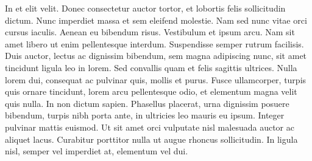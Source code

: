 In et elit velit. Donec consectetur auctor tortor, et lobortis felis
sollicitudin dictum. Nunc imperdiet massa et sem eleifend molestie. Nam sed
nunc vitae orci cursus iaculis. Aenean eu bibendum risus. Vestibulum et ipsum
arcu. Nam sit amet libero ut enim pellentesque interdum. Suspendisse semper
rutrum facilisis. Duis auctor, lectus ac dignissim bibendum, sem magna
adipiscing nunc, sit amet tincidunt ligula leo in lorem. Sed convallis quam et
felis sagittis ultrices. Nulla lorem dui, consequat ac pulvinar quis, mollis
et purus. Fusce ullamcorper, turpis quis ornare tincidunt, lorem arcu
pellentesque odio, et elementum magna velit quis nulla. In non dictum sapien.
Phasellus placerat, urna dignissim posuere bibendum, turpis nibh porta ante,
in ultricies leo mauris eu ipsum. Integer pulvinar mattis euismod. Ut sit amet
orci vulputate nisl malesuada auctor ac aliquet lacus. Curabitur porttitor
nulla ut augue rhoncus sollicitudin. In ligula nisl, semper vel imperdiet at,
elementum vel dui.
